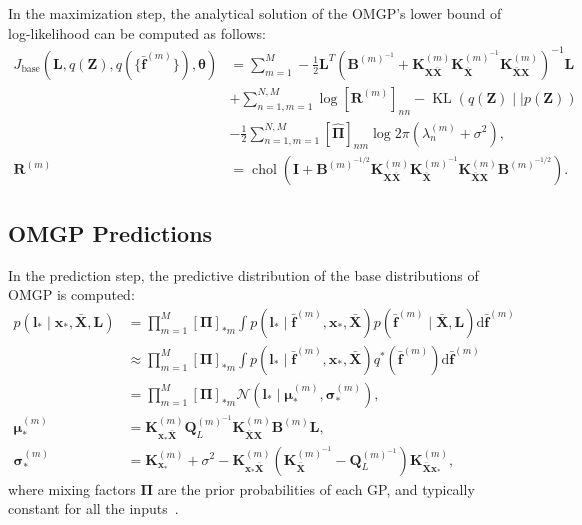 \documentclass[sn-mathphys-num]{sn-jnl}
\begin{document}
In the maximization step, the analytical solution of the OMGP's lower bound of log-likelihood can be computed as follows:
\begin{align}\label{eq:analytical:OMGP_ll}
    J_\mathrm{base}({\mathbf L}, q({\mathbf{Z}}), q(\{\bar{\mathbf{f}}^{(m)}\}), \boldsymbol{\theta})
    & = \sum_{m=1}^M-\frac{1}{2} \mathbf{L}^T \left(\mathbf{B}^{(m)^{-1}}+ \mathbf{K}_{\mathbf{X} \bar{\mathbf{X}}}^{(m)} \mathbf{K}_{\bar{\mathbf{X}}}^{(m)^{-1}} \mathbf{K}_{\bar{\mathbf{X}} \mathbf{X}}^{(m)} \right)^{-1}  \mathbf{L} \nonumber \\
    & +\sum_{n=1, m=1}^{N, M} \log [\mathbf{R}^{(m)}]_{nn}-\operatorname{KL}(q(\mathbf{Z}) \mid\mid p(\mathbf{Z})) \nonumber \\
    & -\frac{1}{2} \sum_{n=1, m=1}^{N, M}[\hat{\mathbf{\Pi}}]_{n m} \log 2 \pi(\lambda_n^{(m)}+\sigma^2), \nonumber \\
    \mathbf{R}^{(m)}&=\operatorname{chol}\left(\mathbf{I}+\mathbf{B}^{(m)^{-1 / 2}} \mathbf{K}_{\mathbf{X} \bar{\mathbf{X}}}^{(m)} \mathbf{K}_{\bar{\mathbf{X}}}^{(m)^{-1}} \mathbf{K}_{\bar{\mathbf{X}} \mathbf{X}}^{(m)}  \mathbf{B}^{(m)^{-1 / 2}}\right) .
\end{align}

\subsection{OMGP Predictions}
In the prediction step, the predictive distribution
of the base distributions of OMGP is computed:
\begin{align}\label{eq:analytical:prediction}
    p(\mathbf{l}_*\mid\mathbf{x}_*,\bar{\mathbf{X}}, \mathbf{L})
    & = \prod^{M}_{m=1} [\boldsymbol{\Pi}]_{*m} \int p(\mathbf{l}_* \mid \bar{\mathbf{f}}^{(m)}, \mathbf{x}_* , \bar{\mathbf{X}}) p(\bar{\mathbf{f}}^{(m)}\mid \bar{\mathbf{X}}, \mathbf{L}) \mathrm{d} \bar{\mathbf{f}}^{(m)}  \nonumber \\
    & \approx \prod^{M}_{m=1} [\boldsymbol{\Pi}]_{*m} \int p(\mathbf{l}_* \mid \bar{\mathbf{f}}^{(m)}, \mathbf{x}_* , \bar{\mathbf{X}}) q^*(\bar{\mathbf{f}}^{(m)}) \mathrm{d} \bar{\mathbf{f}}^{(m)}  \nonumber \\
    & =\prod^{M}_{m=1} [\boldsymbol{\Pi}]_{*m} \mathcal{N}(\mathbf{l}_* \mid \boldsymbol{\mu}_*^{(m)}, \boldsymbol{\sigma}_*^{(m)}), \nonumber\\
    \boldsymbol{\mu}_*^{(m)} &=\mathbf{K}_{\mathbf{x}_* \bar{\mathbf{X}}}^{(m)} \mathbf{Q}_L^{(m)^{-1}} \mathbf{K}_{\bar{\mathbf{X}} \mathbf{X}}^{(m)} \mathbf{B}^{(m)} \mathbf{L}, \nonumber\\
    \boldsymbol{\sigma}_*^{(m)} &=\mathbf{K}_{\mathbf{x}_*}^{(m)}+\sigma^2 -\mathbf{K}^{(m)}_{\mathbf{x}_* \bar{\mathbf{X}}}\left(\mathbf{K}_{\bar{\mathbf{X}}}^{(m)^{-1}}-\mathbf{Q}_L^{(m)^{-1}}\right) \mathbf{K}_{\bar{\mathbf{X}} \mathbf{x}_*}^{(m)},
\end{align}
where mixing factors $\boldsymbol{\Pi}$ are the prior probabilities of each GP, and typically constant for all the inputs~\cite{lazaro2012overlapping}.
\end{document}
